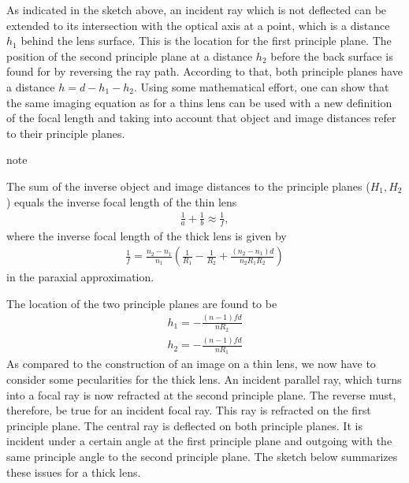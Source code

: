 \documentclass[letterpaper,10pt,english]{sphinxmanual}
\begin{document}
As indicated in the sketch above, an incident ray which is not deflected can be extended to its intersection with the optical axis at a point, which is a distance \(h_1\) behind the lens surface. This is the location for the first principle plane. The position of the second principle plane at a distance \(h_2\) before the back surface is found for by reversing the ray path. According to that, both principle planes have a distance \(h=d-h_1-h_2\). Using some mathematical effort, one
can show that the same imaging equation as for a thins lens can be used with a new definition of the focal length and taking into account that object and image distances refer to their principle planes.

\begin{sphinxadmonition}{note}{}\unskip
{}

The sum of the inverse object and image distances to the principle planes (\(H_1,H_2\)) equals the inverse focal length of the thin lens
\begin{equation*}
\begin{split}\frac{1}{a}+\frac{1}{b}\approx\frac{1}{f},\end{split}
\end{equation*}
where the inverse focal length of the thick lens is given by
\begin{equation*}
\begin{split}\frac{1}{f}=\frac{n_2-n_1}{n_1}\left (\frac{1}{R_1}-\frac{1}{R_2}+\frac{(n_2-n_1)d}{n_2 R_1 R_2}\right )\end{split}
\end{equation*}
in the paraxial approximation.
\end{sphinxadmonition}

The location of the two principle planes are found to be
\begin{equation*}
\begin{split}h_{1}=-\frac{(n-1)f d}{n R_2}\end{split}
\end{equation*}\begin{equation*}
\begin{split}h_{2}=-\frac{(n-1)f d}{n R_1}\end{split}
\end{equation*}
As compared to the construction of an image on a thin lens, we now have to consider some pecularities for the thick lens. An incident parallel ray, which turns into a focal ray is now refracted at the second principle plane. The reverse must, therefore, be true for an incident focal ray. This ray is refracted on the first principle plane. The central ray is deflected on both principle planes. It is incident under a certain angle at the first principle plane and outgoing with the same principle
angle to the second principle plane. The sketch below summarizes these issues for a thick lens.
\end{document}

